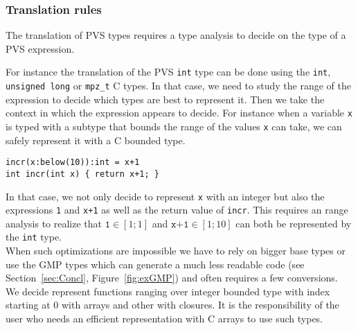 \documentclass[12pt,a4paper]{article}
\newcommand{\cl}[1]{\texttt{#1}}
\begin{document}
\subsubsection{Translation rules}
The translation of PVS types requires a type analysis to decide on the type of a PVS expression.

For instance the translation of the PVS \cl{int} type can be done using the \cl{int}, \cl{unsigned long} or \cl{mpz\_t} C types. In that case, we need to study the range of the expression to decide which types are best to represent it. Then we take the context in which the expression appears to decide. For instance when a variable \cl{x} is typed with a subtype that bounds the range of the values \cl{x} can take, we can safely represent it with a C bounded type.
\begin{lstlisting}
incr(x:below(10)):int = x+1
int incr(int x) { return x+1; }
\end{lstlisting}
In that case, we not only decide to represent \cl{x} with an integer but also the expressions \cl{1} and \cl{x+1} as well as the return value of \cl{incr}. This requires an range analysis to realize that $\cl{1} \in [1;1]$ and $\cl{x+1} \in [1;10]$ can both be represented by the \cl{int} type.\\

When such optimizations are impossible we have to rely on bigger base types or use the GMP types which can generate a much less readable code (see Section~\ref{sec:Concl}, Figure~\ref{fig:exGMP}) and often requires a few conversions. \\

We decide represent functions ranging over integer bounded type with index starting at 0 with arrays and other with closures. It is the responsibility of the user who needs an efficient representation with C arrays to use such types.\\
\end{document}
